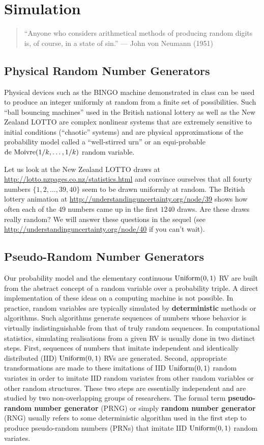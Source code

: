 \chapter{Simulation}\label{S:RNG}

\begin{quote}
``Anyone who considers arithmetical methods of producing random digits is, of course, in a state of sin.'' --- John von Neumann (1951)
\end{quote}

\section{Physical Random Number Generators}\label{S:PhysRNG}
Physical devices such as the BINGO machine demonstrated in class can be used to produce an integer uniformly at random from a finite set of possibilities.  Such ``ball bouncing machines'' used in the British national lottery as well as the New Zealand LOTTO are complex nonlinear systems that are extremely sensitive to initial conditions (``chaotic'' systems) and are physical approximations of the probability model called a ``well-stirred urn'' or an equi-probable $\mbox{{\rm de~Moivre}}(1/k,\ldots,1/k)$ random variable.  

Let us look at the New Zealand LOTTO draws at \url{http://lotto.nzpages.co.nz/statistics.html} and convince ourselves that all fourty numbers $\{1,2,\ldots,39,40\}$ seem to be drawn uniformly at random.  The British lottery animation at \url{http://understandinguncertainty.org/node/39} shows how often each of the $49$ numbers came up in the first $1240$ draws.  Are these draws really random?  We will answer these questions in the sequel (see \url{http://understandinguncertainty.org/node/40} if you can't wait).

\section{Pseudo-Random Number Generators}\label{S:RNGIntro}
Our probability model and the elementary continuous $\mbox{{\rm Uniform}}(0,1)$ RV are built from the abstract concept of a random variable over a probability triple.  A direct implementation of these ideas on a computing machine is not possible. In practice, random variables are typically simulated by {\bf deterministic} methods or algorithms.  Such algorithms generate sequences of numbers 
whose behavior is virtually indistinguishable from that of truly random 
sequences.  In computational statistics, simulating realisations from a given RV is usually done in two distinct steps.  First, sequences of numbers that imitate  independent and identically distributed (IID) $\mbox{{\rm Uniform}}(0,1)$ RVs are generated.  Second, appropriate transformations are made to these imitations of IID $\mbox{{\rm Uniform}}(0,1)$ random variates in order to imitate IID random variates from other random variables or other random structures.  These two steps are essentially independent and are studied by two non-overlapping groups of researchers.  The formal term {\bf pseudo-random number generator} (PRNG) or simply {\bf random number generator} (RNG) usually
refers to some deterministic algorithm used in the first step to produce pseudo-random numbers (PRNs) that imitate IID $\mbox{{\rm Uniform}}(0,1)$ random variates.

